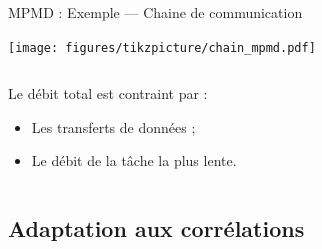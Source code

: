 \documentclass[../main.tex]{subfiles}
\begin{document}
\begin{frame}{MPMD : Exemple --- Chaine de communication}
  \begin{center}
    \texttt{[image: figures/tikzpicture/chain\_mpmd.pdf]}
  \end{center}

  \vspace{1 em}

  \begin{columns}
    \begin{column}{.5\linewidth}
      Le débit total est contraint par :
      \begin{itemize}
        \item Les transferts de données ;
        \item Le débit de la tâche la plus lente.
      \end{itemize}
    \end{column}
  \end{columns}
\end{frame}

\subsection{Adaptation aux corrélations}
\end{document}
